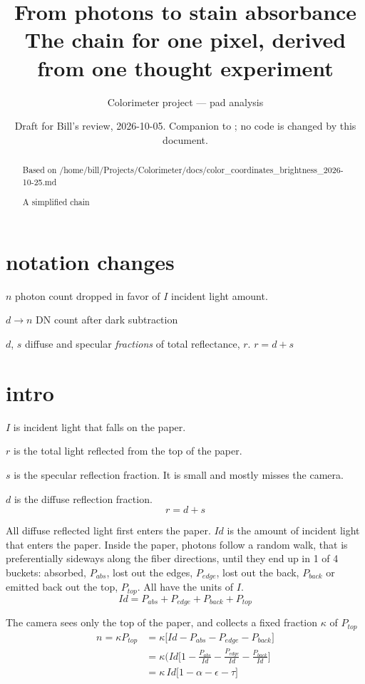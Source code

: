\documentclass[11pt,letter]{article}
\title{From photons to stain absorbance\\
\large The chain for one pixel, derived from one thought experiment}
\author{Colorimeter project --- pad analysis}
\date{Draft for Bill's review, 2026-10-05.  Companion to
\file{analysis\_chain.tex}; no code is changed by this document.}
\begin{document}
\maketitle

\begin{abstract}
\noindent
Based on /home/bill/Projects/Colorimeter/docs/color\_coordinates\_brightness\_2026-10-25.md

A simplified chain
\end{abstract}

\tableofcontents

\section{notation changes}

$n$ photon count dropped in favor of $I$ incident light amount.

$d \to n$ DN count after dark subtraction

$d$, $s$ diffuse and specular \textit{fractions} of total reflectance, $r$.   $r = d + s$ 

\section{intro}

$I$ is incident light that falls on the paper.

$r$ is the total light reflected from the top of the paper.

$s$ is the specular reflection fraction. It is small and mostly misses the camera.

$d$ is the diffuse reflection fraction. 
\begin{equation}
	r = d + s
\end{equation}

All diffuse reflected light first enters the paper.
$I d$ is the amount of incident light that enters the paper.
Inside the paper, photons follow a random walk, 
that is preferentially sideways along the fiber directions, 
until they end up in 1 of 4 buckets: absorbed, $P_{abs}$, lost out the edges, $P_{edge}$, lost out the back, $P_{back}$ or emitted back out the top, $P_{top}$.  
All have the units of $I$.
\begin{equation}
	I d = P_{abs} + P_{edge} + P_{back} + P_{top}
\end{equation}

The camera sees only the top of the paper, and collects a fixed fraction $\kappa$ of $P_{top}$
\begin{equation}
\begin{aligned}
	n = \kappa P_{top} &= \kappa\big[I d - P_{abs} - P_{edge} - P_{back}\big]
	\\  &= \kappa(I d\big[ 1 - \frac{P_{abs}}{I d} - 
	       \frac{P_{edge}}{I d} - \frac{P_{back}}{I d} \big]
	\\  &= \kappa\,I d\big[ 1 - \alpha - \epsilon - \tau \big]	 
\end{aligned}
\end{equation}
\end{document}
